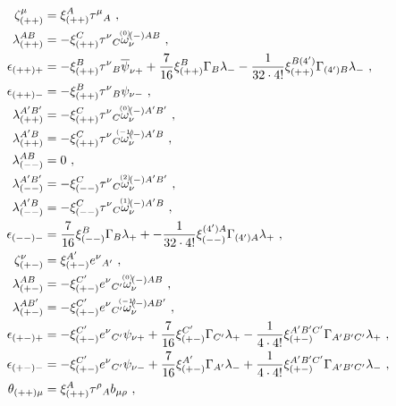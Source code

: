\documentclass[a4paper,10pt,openany]{article}
\begin{document}
	\begin{subequations}
		\begin{align}
			\zeta^{\mu}_{(++)}&=\xi^{A}_{(++)}\tau^{\mu}{}_{A}\ , \\
			\lambda^{AB}_{(++)}&=-\xi^{C}_{(++)}\tau^{\nu}{}_{C}\accentset{(0)}{\omega}_{\nu}^{(-)AB}\ , \\
			\epsilon_{(++)+}&=-\xi^{B}_{(++)}\tau^{\nu}{}_{B}\overline{\psi}_{\nu +}+\frac{7}{16}\xi^{B}_{(++)}\Gamma_{B}\lambda_{-}-\frac{1}{32\cdot 4!}\xi^{B(4')}_{(++)}\Gamma_{(4')B}\lambda_{-}\ , \\
			\epsilon_{(++)-}&=-\xi^{B}_{(++)}\tau^{\nu}{}_{B}\psi_{\nu -}\ , \\
			\lambda^{A'B'}_{(++)}&=-\xi^{C}_{(++)}\tau^{\nu}{}_{C}\accentset{(0)}{\omega}_{\nu}^{(-)A'B'}\ , \\
			\lambda^{A'B}_{(++)}&=-\xi^{C}_{(++)}\tau^{\nu}{}_{C}\accentset{(-1)}{\omega}_{\nu}^{(-)A'B}\ , \\
			\lambda^{AB}_{(--)}&=0\ , \\
			\lambda^{A'B'}_{(--)}&=-\xi^{C}_{(--)}\tau^{\nu}{}_{C}\accentset{(2)}{\omega}_{\nu}^{(-)A'B'}\ , \\
			\lambda^{A'B}_{(--)}&=-\xi^{C}_{(--)}\tau^{\nu}{}_{C}\accentset{(1)}{\omega}_{\nu}^{(-)A'B}\ , \\
			\epsilon_{(--)-}&=\frac{7}{16}\xi_{(--)}^{B}\Gamma_{B}\lambda_{+}+-\frac{1}{32\cdot 4!}\xi_{(--)}^{(4')A}\Gamma_{(4')A}\lambda_{+}\ , \\
			\zeta^{\nu}_{(+-)}&=\xi^{A'}_{(+-)}e^{\nu}{}_{A'}\ , \\
			\lambda^{AB}_{(+-)}&=-\xi^{C'}_{(+-)}e^{\nu}{}_{C'}\accentset{(0)}{\omega}_{\nu}^{(-)AB}\ , \\
			\lambda^{AB'}_{(+-)}&=-\xi^{C'}_{(+-)}e^{\nu}{}_{C'}\accentset{(-1)}{\omega}_{\nu}^{(-)AB'}\ , \\
			\epsilon_{(+-)+}&=-\xi^{C'}_{(+-)}e^{\nu}{}_{C'}\psi_{\nu +}+\frac{7}{16}\xi^{C'}_{(+-)}\Gamma_{C'}\lambda_{+}-
			\frac{1}{4\cdot 4!}\xi^{A'B'C'}_{(+-)}\Gamma_{A'B'C'}\lambda_{+}\ , \\
			\epsilon_{(+-)-}&=-\xi^{C'}_{(+-)}e^{\nu}{}_{C'}\psi_{\nu -}+\frac{7}{16}\xi^{A'}_{(+-)}\Gamma_{A'}\lambda_{-}
			+\frac{1}{4\cdot 4!}\xi^{A'B'C'}_{(+-)}\Gamma_{A'B'C'}\lambda_{-}\ , \\
			\theta_{(++)\mu}&=\xi^{A}_{(++)}\tau^{\rho}{}_{A}b_{\mu\rho}\ , \\

\end{align}
\end{subequations}
\end{document}
